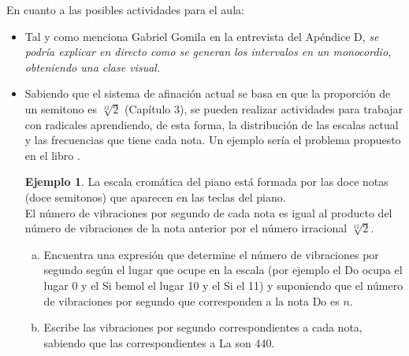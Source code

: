 \documentclass[a4paper, openright, 11pt, titlepage]{report}
\theoremstyle{definition}\newtheorem{defin}[propo]{Definition}
\theoremstyle{definition}\newtheorem{obser}[propo]{Remark}
\theoremstyle{definition}\newtheorem{ejem}[propo]{Ejemplo}
\theoremstyle{definition}\newtheorem{algoritmo}[propo]{Algoritmo}
\begin{document}
En cuanto a las posibles actividades para el aula:
\begin{itemize}
    \item Tal y como menciona Gabriel Gomila en la entrevista del Apéndice D, \textit{se podría explicar en directo como se generan los intervalos en un monocordio, obteniendo una clase visual.}
    \item Sabiendo que el sistema de afinación actual se basa en que la proporción de un semitono es $\sqrt[12]{2}$ (Capítulo 3), se pueden realizar actividades para trabajar con radicales aprendiendo, de esta forma, la distribución de las escalas actual y las frecuencias que tiene cada nota. Un ejemplo sería el problema propuesto en el libro \cite{papa}.\\
    \begin{ejem}
    La escala cromática del piano está formada por las doce notas (doce semitonos) que aparecen en las teclas del piano.\\
    El número de vibraciones por segundo de cada nota es igual al producto del número de vibraciones de la nota anterior por el número irracional $\sqrt[12]{2}$.
    \begin{enumerate}[(a)]
        \item Encuentra una expresión que determine el número de vibraciones por segundo según el lugar que ocupe en la escala (por ejemplo el Do ocupa el lugar 0 y el Si bemol el lugar 10 y el Si el 11) y suponiendo que el número de vibraciones por segundo que corresponden a la nota Do es $n$.
        \item Escribe las vibraciones por segundo correspondientes a cada nota, sabiendo que las correspondientes a La son 440.
    \end{enumerate}
    \end{ejem}
\end{itemize}
\newpage
\appendix
\end{document}
